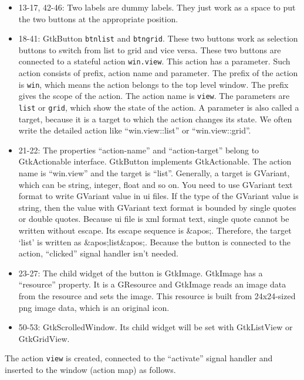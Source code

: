 \begin{itemize}
\tightlist
\item
  13-17, 42-46: Two labels are dummy labels. They just work as a space
  to put the two buttons at the appropriate position.
\item
  18-41: GtkButton \passthrough{\lstinline!btnlist!} and
  \passthrough{\lstinline!btngrid!}. These two buttons work as selection
  buttons to switch from list to grid and vice versa. These two buttons
  are connected to a stateful action \passthrough{\lstinline!win.view!}.
  This action has a parameter. Such action consists of prefix, action
  name and parameter. The prefix of the action is
  \passthrough{\lstinline!win!}, which means the action belongs to the
  top level window. The prefix gives the scope of the action. The action
  name is \passthrough{\lstinline!view!}. The parameters are
  \passthrough{\lstinline!list!} or \passthrough{\lstinline!grid!},
  which show the state of the action. A parameter is also called a
  target, because it is a target to which the action changes its state.
  We often write the detailed action like ``win.view::list'' or
  ``win.view::grid''.
\item
  21-22: The properties ``action-name'' and ``action-target'' belong to
  GtkActionable interface. GtkButton implements GtkActionable. The
  action name is ``win.view'' and the target is ``list''. Generally, a
  target is GVariant, which can be string, integer, float and so on. You
  need to use GVariant text format to write GVariant value in ui files.
  If the type of the GVariant value is string, then the value with
  GVariant text format is bounded by single quotes or double quotes.
  Because ui file is xml format text, single quote cannot be written
  without escape. Its escape sequence is \&apos;. Therefore, the target
  `list' is written as \&apos;list\&apos;. Because the button is
  connected to the action, ``clicked'' signal handler isn't needed.
\item
  23-27: The child widget of the button is GtkImage. GtkImage has a
  ``resource'' property. It is a GResource and GtkImage reads an image
  data from the resource and sets the image. This resource is built from
  24x24-sized png image data, which is an original icon.
\item
  50-53: GtkScrolledWindow. Its child widget will be set with
  GtkListView or GtkGridView.
\end{itemize}

The action \passthrough{\lstinline!view!} is created, connected to the
``activate'' signal handler and inserted to the window (action map) as
follows.

